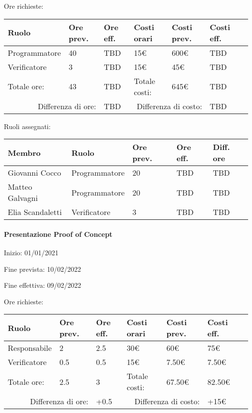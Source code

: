 \documentclass[a4paper, 12pt]{article}
\begin{document}
Ore richieste:\\[0.5em]
\begin{tabular}{|l|l|l||l|l|l|l|}\hline
Ruolo & Ore prev. & Ore eff. & Costi orari & Costi prev. & Costi eff.\\\hline
Programmatore & 40 & TBD & 15\euro & 600\euro & TBD \\\hline
Verificatore & 3 & TBD & 15\euro & 45\euro & TBD \\\hline
Totale ore: & 43 & TBD & Totale costi: & 645\euro & TBD \\\hline
\multicolumn{2}{|r|}{Differenza di ore:} & TBD & \multicolumn{2}{r|}{Differenza di costo:} & TBD \\\hline
\end{tabular}

Ruoli assegnati:\\[0.5em]
\begin{tabular}{|l|l|l|l|l|}\hline
Membro & Ruolo & Ore prev. & Ore eff. & Diff. ore \\\hline
Giovanni Cocco & Programmatore & 20 & TBD & TBD \\\hline
Matteo Galvagni & Programmatore & 20 & TBD & TBD \\\hline
Elia Scandaletti & Verificatore & 3 & TBD & TBD \\\hline
\end{tabular}

\paragraph{Presentazione Proof of Concept}
Inizio: 01/01/2021\par
Fine prevista: 10/02/2022\par
Fine effettiva: 09/02/2022

Ore richieste:\\[0.5em]
\begin{tabular}{|l|l|l||l|l|l|l|}\hline
Ruolo & Ore prev. & Ore eff. & Costi orari & Costi prev. & Costi eff.\\\hline
Responsabile & 2 & 2.5 & 30\euro & 60\euro & 75\euro \\\hline
Verificatore & 0.5 & 0.5 & 15\euro & 7.50\euro & 7.50\euro \\\hline
Totale ore: & 2.5 & 3 & Totale costi: & 67.50\euro & 82.50\euro \\\hline
\multicolumn{2}{|r|}{Differenza di ore:} & +0.5 & \multicolumn{2}{r|}{Differenza di costo:} & +15\euro \\\hline
\end{tabular}
\end{document}
